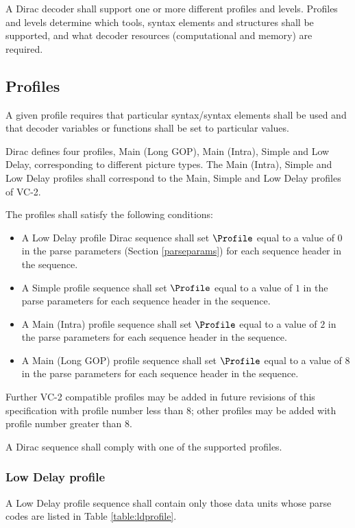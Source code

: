 \label{profilelevel}

A Dirac decoder shall support one or more different profiles and levels. 
Profiles and levels determine which tools, syntax elements and structures 
shall be supported, and what decoder resources (computational and memory) are required.

\subsection{Profiles}
\label{profiles}
A given profile requires that particular syntax/syntax elements shall 
be used and that decoder variables or functions shall be set to particular values.

Dirac defines four profiles, Main (Long GOP), Main (Intra), Simple and Low Delay, 
corresponding to different picture types. The Main (Intra), Simple and Low Delay
profiles shall correspond to the Main, Simple and Low Delay profiles of VC-2. 

The profiles shall satisfy the following conditions:
\begin{itemize}
\item A Low Delay profile Dirac sequence shall set $\Profile$ equal to a value of 
$0$ in the parse parameters (Section \ref{parseparams}) for each sequence header 
in the sequence.
\item A Simple profile sequence shall set $\Profile$ equal to a value of $1$ 
in the parse parameters for each sequence header in the sequence.
\item A Main (Intra) profile sequence shall set $\Profile$ equal to a value of $2$ 
in the parse parameters for each sequence header in the sequence.
\item A Main (Long GOP) profile sequence shall set $\Profile$ equal to a value of $8$ 
in the parse parameters for each sequence header in the sequence.
\end{itemize}

Further VC-2 compatible profiles may be added in future revisions of this 
specification with profile number less than 8; other profiles may be added with
profile number greater than 8.

A Dirac sequence shall comply with one of the supported profiles.

\subsubsection{Low Delay profile}

A Low Delay profile sequence shall contain only those data units whose 
parse codes are listed in Table \ref{table:ldprofile}.

